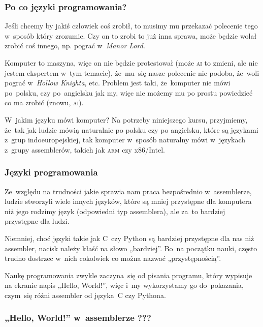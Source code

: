 \documentclass[10pt,t]{beamer}
\begin{document}
\begin{frame}
  \frametitle{Po co języki programowania?}


  Jeśli chcemy by jakiś człowiek coś zrobił, to musimy mu przekazać
  polecenie tego w~sposób który zrozumie. Czy on to zrobi to już inna
  sprawa, może będzie wolał zrobić coś innego, np. pograć w~\textit{Manor
    Lord}.

  Komputer to maszyna, więc on nie będzie protestował (może \textsc{ai} to
  zmieni, ale nie jestem ekspertem w~tym temacie), że~mu~się nasze polecenie
  nie podoba, że~woli pograć w~\textit{Hollow Knighta}, etc. Problem jest
  taki, że~komputer nie mówi po~polsku, czy po~angielsku jak my, więc nie
  możemy mu po prostu powiedzieć co ma zrobić (znowu, \textsc{ai}).

  W~jakim języku mówi komputer? Na potrzeby niniejszego kursu, przyjmiemy,
  że~tak jak ludzie mówią naturalnie po polsku czy po angielsku, które są
  językami z~grup indoeuropejskiej, tak komputer w~sposób naturalny mówi
  w~językach z~grupy assemblerów, takich jak \textsc{arm} czy x86/Intel.

\end{frame}





\begin{frame}
  \frametitle{Języki programowania}


  Ze~względu na trudności jakie sprawia nam praca bezpośrednio
  w~assemblerze, ludzie stworzyli wiele innych języków, które są mniej
  przystępne dla komputera niż jego rodzimy język (odpowiedni typ
  assemblera), ale za~to bardziej przystępne dla ludzi.

  Niemniej, choć języki takie jak C~czy Python są bardziej przystępne dla
  nas niż assembler, nacisk należy kłaść na słowo „bardziej”. Bo~na początku
  nauki, często trudno dostrzec w~nich cokolwiek co można nazwać
  „przystępnością”.

  Naukę programowania zwykle zaczyna~się od pisania programu, który
  wypisuje na ekranie napis „Hello, World!”, więc i~my wykorzystamy go
  do~pokazania, czym~się różni assembler od języka~C czy Pythona.

\end{frame}





\begin{frame}
  \frametitle{„Hello, World!” w~assemblerze ???}



\end{frame}
\end{document}
